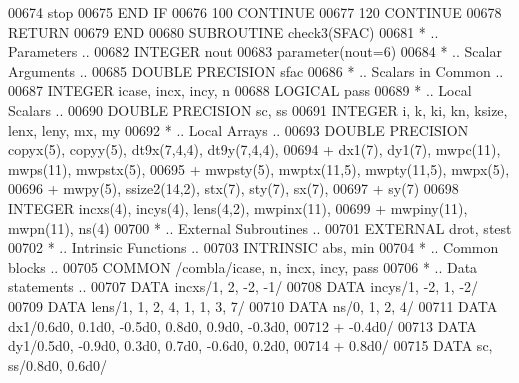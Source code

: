 \begin{DoxyCode}
00674                stop
00675 \textcolor{keywordflow}{            END IF}
00676   100    \textcolor{keywordflow}{CONTINUE}
00677   120 \textcolor{keywordflow}{CONTINUE}
00678       \textcolor{keywordflow}{RETURN}
00679 \textcolor{keyword}{      END}
00680 \textcolor{keyword}{      SUBROUTINE }check3(SFAC)
00681 \textcolor{comment}{*     .. Parameters ..}
00682       \textcolor{keywordtype}{INTEGER}           nout
00683       parameter(nout=6)
00684 \textcolor{comment}{*     .. Scalar Arguments ..}
00685       \textcolor{keywordtype}{DOUBLE PRECISION}  sfac
00686 \textcolor{comment}{*     .. Scalars in Common ..}
00687       \textcolor{keywordtype}{INTEGER}           icase, incx, incy, n
00688       \textcolor{keywordtype}{LOGICAL}           pass
00689 \textcolor{comment}{*     .. Local Scalars ..}
00690       \textcolor{keywordtype}{DOUBLE PRECISION}  sc, ss
00691       \textcolor{keywordtype}{INTEGER}           i, k, ki, kn, ksize, lenx, leny, mx, my
00692 \textcolor{comment}{*     .. Local Arrays ..}
00693       \textcolor{keywordtype}{DOUBLE PRECISION}  copyx(5), copyy(5), dt9x(7,4,4), dt9y(7,4,4),
00694      +                  dx1(7), dy1(7), mwpc(11), mwps(11), mwpstx(5),
00695      +                  mwpsty(5), mwptx(11,5), mwpty(11,5), mwpx(5),
00696      +                  mwpy(5), ssize2(14,2), stx(7), sty(7), sx(7),
00697      +                  sy(7)
00698       \textcolor{keywordtype}{INTEGER}           incxs(4), incys(4), lens(4,2), mwpinx(11),
00699      +                  mwpiny(11), mwpn(11), ns(4)
00700 \textcolor{comment}{*     .. External Subroutines ..}
00701       \textcolor{keywordtype}{EXTERNAL}          drot, stest
00702 \textcolor{comment}{*     .. Intrinsic Functions ..}
00703       \textcolor{keywordtype}{INTRINSIC}         abs, min
00704 \textcolor{comment}{*     .. Common blocks ..}
00705       \textcolor{keyword}{COMMON}            /combla/icase, n, incx, incy, pass
00706 \textcolor{comment}{*     .. Data statements ..}
00707       \textcolor{keyword}{DATA}              incxs/1, 2, -2, -1/
00708       \textcolor{keyword}{DATA}              incys/1, -2, 1, -2/
00709       \textcolor{keyword}{DATA}              lens/1, 1, 2, 4, 1, 1, 3, 7/
00710       \textcolor{keyword}{DATA}              ns/0, 1, 2, 4/
00711       \textcolor{keyword}{DATA}              dx1/0.6d0, 0.1d0, -0.5d0, 0.8d0, 0.9d0, -0.3d0,
00712      +                  -0.4d0/
00713       \textcolor{keyword}{DATA}              dy1/0.5d0, -0.9d0, 0.3d0, 0.7d0, -0.6d0, 0.2d0,
00714      +                  0.8d0/
00715       \textcolor{keyword}{DATA}              sc, ss/0.8d0, 0.6d0/

\end{DoxyCode}
